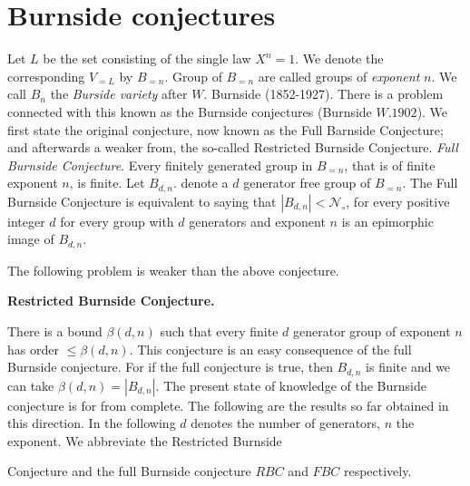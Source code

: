 \section{Burnside conjectures}%

Let $L$ be the set consisting of the single law $X^n=1$. We denote the
corresponding $V_{=L}$ by $B_{=n}$. Group of $B_{=n}$ are called
groups of \textit{exponent} $n$. We call $B_n$ the \textit{Burside
  variety} after $W$.  
Burnside (1852-1927). There is a problem connected with this known as
the Burnside conjectures (Burnside $W.1902$). We first state the
original conjecture, now known as the Full Barnside Conjecture; and
afterwards a weaker from, the so-called Restricted Burnside
Conjecture. \textit{Full Burnside Conjecture}. Every finitely
generated group in $B_{=n}$, that is of finite exponent $n$, is
finite. Let $B_{d, n}$. denote a $d$ generator free group of
$B_{=n}$. The Full Burnside Conjecture is equivalent to saying that $|
B_{d, n}| < \mathscr{N}_\circ$, for every positive integer $d$ for
every group with $d$ generators and exponent $n$ is an epimorphic
image of $B_{d, n}$. 

The following problem is weaker than the above conjecture.

\noindent
 {\bf Restricted Burnside Conjecture.}

There is a bound $\beta(d, n)$ such that every finite $d$ generator
group of exponent $n$ has order $\leq \beta(d, n)$. This conjecture is
an easy consequence of the full Burnside conjecture. For if the full
conjecture is true, then $B_{d, n}$ is finite and we can take
$\beta(d, n) = |B_{d, n}|$. The present state of knowledge of the
Burnside conjecture is for from complete. The following are the
results so far obtained in this direction. In the following $d$
denotes the number of generators, $n$ the exponent. We abbreviate the
Restricted Burnside  

Conjecture and the full Burnside conjecture $RBC$ and $FBC$
respectively. 

